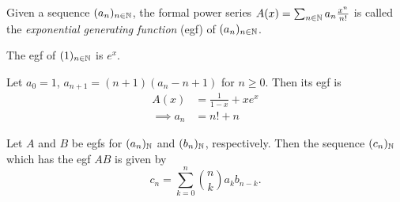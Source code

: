 \begin{definition*} \label{def:egf}
    Given a sequence $(a_n)_{n \in \mathbb{N}}$, the formal power series
    $A(x) = \sum_{n \in \mathbb{N}} a_n \frac{x^n}{n!}$ is called the
    \emph{exponential generating function} (egf) of $(a_n)_{n \in \mathbb{N}}$.
\end{definition*}
\begin{examples}
    \item The egf of $(1)_{n \in \mathbb{N}}$ is $e^x$.
    \item Let $a_0 = 1$, $a_{n+1} = (n + 1)(a_n - n + 1)$ for $n \ge 0$.
    Then its egf is \begin{align*}
        A(x) &= \frac{1}{1 - x} + x e^{x} \\
        \implies a_n &= n! + n
    \end{align*}
\end{examples}

\begin{exercise*} \label{thm:egf:product}
    Let $A$ and $B$ be egfs for $(a_n)_{\mathbb{N}}$ and $(b_n)_{\mathbb{N}}$, respectively.
    Then the sequence $(c_n)_{\mathbb{N}}$ which has the egf $AB$ is given by \[
        c_n = \sum_{k=0}^{n} \binom{n}{k} a_k b_{n-k}.
    \]
\end{exercise*}

